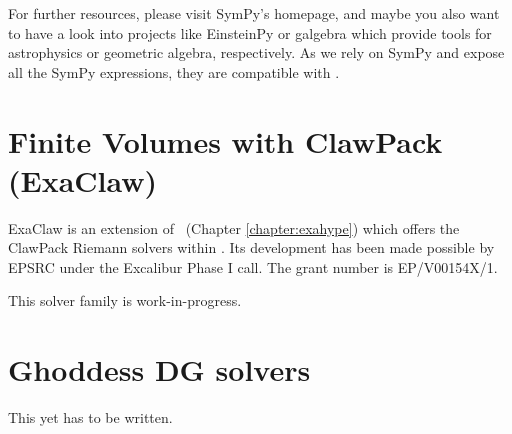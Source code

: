 For further resources, please visit SymPy's homepage, and maybe you also want to
have a look into projects like EinsteinPy or galgebra which provide tools for
astrophysics or geometric algebra, respectively.
As we rely on SymPy and expose all the SymPy expressions, they are compatible
with \ExaHyPE.



\section{Finite Volumes with ClawPack (ExaClaw)}

ExaClaw is an extension of \ExaHyPE\ (Chapter \ref{chapter:exahype}) which
offers the ClawPack Riemann solvers within \ExaHyPE.
Its development has been made possible by EPSRC under the Excalibur
Phase I call.
The grant number is EP/V00154X/1.


\begin{remark}
 This solver family is work-in-progress.
\end{remark}



\section{Ghoddess DG solvers}
% 
% 
\begin{remark}
  This yet has to be written.
\end{remark}
 
% 
% 
% 
% 
% 
% 
% 
% 



